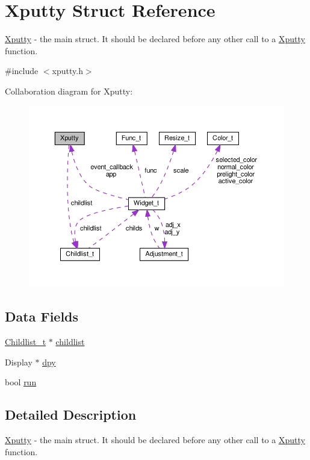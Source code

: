 \hypertarget{structXputty}{}\section{Xputty Struct Reference}
\label{structXputty}


\hyperlink{structXputty}{Xputty} -\/ the main struct. It should be declared before any other call to a \hyperlink{structXputty}{Xputty} function.  




{\ttfamily \#include $<$xputty.\+h$>$}



Collaboration diagram for Xputty\+:
\nopagebreak
\begin{figure}[H]
\begin{center}
\leavevmode
\includegraphics[width=350pt]{structXputty__coll__graph}
\end{center}
\end{figure}
\subsection*{Data Fields}
\begin{DoxyCompactItemize}
\item 
\hyperlink{structChildlist__t}{Childlist\+\_\+t} $\ast$ \hyperlink{structXputty_a55fafc08d9702ab14137f52f35c4ff19}{childlist}
\item 
Display $\ast$ \hyperlink{structXputty_ab185ae4fd00ee1930c61e0440734878f}{dpy}
\item 
bool \hyperlink{structXputty_a3a8e0381e77ae9fae69aab5dda8e7e7a}{run}
\end{DoxyCompactItemize}


\subsection{Detailed Description}
\hyperlink{structXputty}{Xputty} -\/ the main struct. It should be declared before any other call to a \hyperlink{structXputty}{Xputty} function. 


